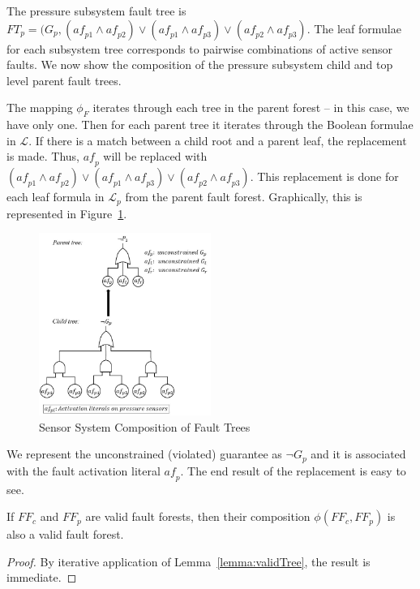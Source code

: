 The pressure subsystem fault tree is $\mathit{FT}_{p} = (G_p, (\mathit{af}_{p1} \land \mathit{af}_{p2}) \lor (\mathit{af}_{p1} \land \mathit{af}_{p3}) \lor (\mathit{af}_{p2} \land \mathit{af}_{p3}) $. The leaf formulae for each subsystem tree corresponds to pairwise combinations of active sensor faults. We now show the composition of the pressure subsystem child and top level parent fault trees. 

The mapping $\phi_F$ iterates through each tree in the parent forest -- in this case, we have only one. Then for each parent tree it iterates through the Boolean formulae in $\mathcal{L}$. If there is a match between a child root and a parent leaf, the replacement is made.
Thus, $\mathit{af}_p$ will be replaced with $(\mathit{af}_{p1} \land \mathit{af}_{p2}) \lor (\mathit{af}_{p1} \land \mathit{af}_{p3}) \lor (\mathit{af}_{p2} \land \mathit{af}_{p3})$. This replacement is done for each leaf formula in $\mathcal{L}_p$ from the parent fault forest. Graphically, this is represented in Figure~\ref{fig:sensorSysComp}. 

\begin{figure}[h!]
	\begin{center}
		\includegraphics[width=0.5\textwidth]{images/faultCompEx.JPG}
	\end{center}
	\caption{Sensor System Composition of Fault Trees}
	\label{fig:sensorSysComp}
\end{figure}

We represent the unconstrained (violated) guarantee as $\neg G_p$ and it is associated with the fault activation literal $\mathit{af}_p$. The end result of the replacement is easy to see.

\begin{lemma} If $\mathit{FF}_c$ and $\mathit{FF}_p$ are valid fault forests, then their composition $\phi(\mathit{FF}_c, \mathit{FF}_p)$ is also a valid fault forest. 
\begin{proof}
By iterative application of Lemma~\ref{lemma:validTree}, the result is immediate.
\end{proof}
\label{lemma:validForest}
\end{lemma}

